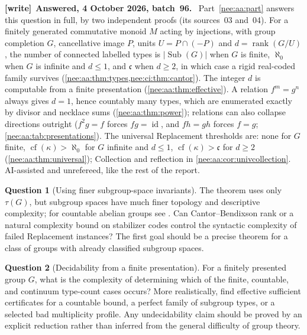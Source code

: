 \documentclass[11pt,letterpaper]{article}
\numberwithin{equation}{section}
\theoremstyle{plain}
\theoremstyle{definition}
\newtheorem{question}[question]{Question}
\theoremstyle{remark}
\newcommand{\cf}{\operatorname{cf}}
\newcommand{\cont}{\mathfrak c}
\newcommand{\Sub}{\operatorname{Sub}}
\newcommand{\id}{\operatorname{id}}
\newcommand{\rank}{\operatorname{rank}}
\newenvironment{writenote}[1][]{\par\smallskip\begingroup\small\raggedright
 \setlength{\parindent}{1.25em}\noindent\textbf{[write]}\if\relax\detokenize{#1}\relax\else~\textbf{#1.}\fi\ }%
 {\par\endgroup\smallskip}
\begin{document}
\begin{writenote}[Answered, 4 October 2026, batch~96]
Part~\ref{nee:aa:part} answers this question in full, by two independent proofs (its sources~03 and~04). For a finitely generated commutative monoid $M$ acting by injections, with group completion $G$, cancellative image $P$, units $U=P\cap(-P)$ and $d=\rank(G/U)$, the number of connected labelled types is $|\Sub(G)|$ when $G$ is finite, $\aleph_0$ when $G$ is infinite and $d\leq1$, and $\cont$ when $d\geq2$, in which case a rigid real-coded family survives (\cref{nee:aa:thm:types,nee:ci:thm:cantor}). The integer $d$ is computable from a finite presentation (\cref{nee:aa:thm:effective}). A relation $f^m=g^n$ always gives $d=1$, hence countably many types, which are enumerated exactly by divisor and necklace sums (\cref{nee:aa:thm:power}); relations can also collapse directions outright ($f^2g=f$ forces $fg=\id$, and $fh=gh$ forces $f=g$; \cref{nee:aa:tab:presentations}). The universal Replacement thresholds are: none for $G$ finite, $\cf(\kappa)>\aleph_0$ for $G$ infinite and $d\leq1$, $\cf(\kappa)>\cont$ for $d\geq2$ (\cref{nee:aa:thm:universal}); Collection and reflection in \cref{nee:aa:cor:univcollection}. AI-assisted and unrefereed, like the rest of the report.
\end{writenote}

\begin{question}[Using finer subgroup-space invariants]\label{nee:ca:q:subgroupspaces}
The theorem uses only $\tau(G)$, but subgroup spaces have much finer topology and descriptive complexity; for countable abelian groups see \cite{CGP2010}. Can Cantor--Bendixson rank or a natural complexity bound on stabilizer codes control the syntactic complexity of failed Replacement instances? The first goal should be a precise theorem for a class of groups with already classified subgroup spaces.
\end{question}

\begin{question}[Decidability from a finite presentation]\label{nee:ca:q:decidability}
For a finitely presented group $G$, what is the complexity of determining which of the finite, countable, and continuum type-count cases occurs? More realistically, find effective sufficient certificates for a countable bound, a perfect family of subgroup types, or a selected bad multiplicity profile. Any undecidability claim should be proved by an explicit reduction rather than inferred from the general difficulty of group theory.
\end{question}
\end{document}
